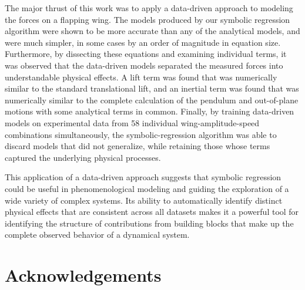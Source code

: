 \documentclass{article}
\begin{document}
The major thrust of this work was to apply a data-driven approach to modeling
the forces on a flapping wing.  The models produced by our symbolic regression
algorithm were shown to be more accurate than any of the analytical models, and
were much simpler, in some cases by an order of magnitude in equation size.
Furthermore, by dissecting these equations and examining individual terms, it
was observed that the data-driven models separated the measured forces into
understandable physical effects.  A lift term was found that was numerically
similar to the standard translational lift, and an inertial term was found that
was numerically similar to the complete calculation of the pendulum and
out-of-plane motions with some analytical terms in common.  Finally, by training
data-driven models on experimental data from 58 individual wing-amplitude-speed
combinations simultaneously, the symbolic-regression algorithm was able to
discard models that did not generalize, while retaining those whose terms
captured the underlying physical processes.

This application of a data-driven approach suggests that symbolic regression
could be useful in phenomenological modeling and guiding the exploration of a
wide variety of complex systems.  Its ability to automatically identify distinct
physical effects that are consistent across all datasets makes it a powerful
tool for identifying the structure of contributions from building blocks that
make up the complete observed behavior of a dynamical system.




%

\section*{Acknowledgements}
\end{document}
